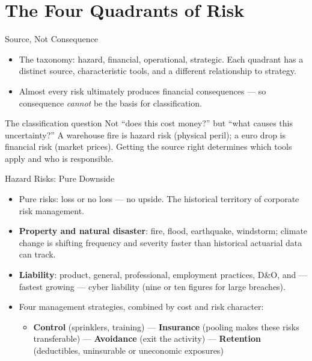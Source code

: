 \documentclass[11pt, aspectratio=169]{beamer}
\begin{document}
\section{The Four Quadrants of Risk}

\begin{frame}{Source, Not Consequence}
\begin{itemize}
  \item The taxonomy: \alert{hazard}, \alert{financial}, \alert{operational}, \alert{strategic}. Each quadrant has a distinct source, characteristic tools, and a different relationship to strategy.
  \item Almost every risk ultimately produces financial consequences --- so consequence \emph{cannot} be the basis for classification.
\end{itemize}
\medskip
\begin{block}{The classification question}
Not ``does this cost money?'' but \alert{``what causes this uncertainty?''} A warehouse fire is hazard risk (physical peril); a euro drop is financial risk (market prices). Getting the source right determines which tools apply and who is responsible.
\end{block}
\end{frame}

\begin{frame}{Hazard Risks: Pure Downside}
\begin{itemize}
  \item \alert{Pure risks}: loss or no loss --- no upside. The historical territory of corporate risk management.
  \item \textbf{Property and natural disaster}: fire, flood, earthquake, windstorm; climate change is shifting frequency and severity faster than historical actuarial data can track.
  \item \textbf{Liability}: product, general, professional, employment practices, D\&O, and --- fastest growing --- \alert{cyber liability} (nine or ten figures for large breaches).
  \item Four management strategies, combined by cost and risk character:
  \begin{itemize}
    \item \textbf{Control} (sprinklers, training) --- \textbf{Insurance} (pooling makes these risks transferable) --- \textbf{Avoidance} (exit the activity) --- \textbf{Retention} (deductibles, uninsurable or uneconomic exposures)
  \end{itemize}
\end{itemize}
\end{frame}
\end{document}
